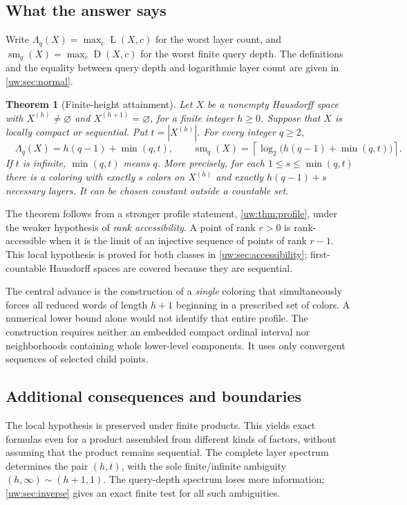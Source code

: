 \documentclass[11pt,letterpaper]{article}
\numberwithin{equation}{section}
\newtheorem{theorem}{Theorem}[section]
\theoremstyle{definition}
\theoremstyle{remark}
\theoremstyle{definition}
\newcommand{\ceil}[1]{\left\lceil#1\right\rceil}
\newcommand{\depth}{\operatorname{D}}
\newcommand{\layers}{\operatorname{L}}
\newcommand{\smq}{\operatorname{sm}_{q}}
\begin{document}
\subsection{What the answer says}
Write $\Lambda_q(X)=\max_c\layers(X,c)$ for the worst layer count, and
$\smq(X)=\max_c\depth(X,c)$ for the worst finite query depth. The definitions
and the equality between query depth and logarithmic layer count are given
in \cref{uw:sec:normal}.

\begin{theorem}[Finite-height attainment]\label{uw:thm:intro}
Let $X$ be a nonempty Hausdorff space with
$X^{(h)}\ne\varnothing$ and $X^{(h+1)}=\varnothing$, for a finite integer
$h\ge0$. Suppose that $X$ is locally compact or sequential. Put
$t=|X^{(h)}|$. For every integer $q\ge2$,
\begin{equation}\label{uw:eq:main-formula}
 \boxed{\quad
 \Lambda_q(X)=h(q-1)+\min(q,t),\qquad
 \smq(X)=\ceil{\log_2\bigl(h(q-1)+\min(q,t)\bigr)}.
 \quad}
\end{equation}
If $t$ is infinite, $\min(q,t)$ means $q$. More precisely, for each
$1\le s\le\min(q,t)$ there is a coloring with exactly $s$ colors on
$X^{(h)}$ and exactly $h(q-1)+s$ necessary layers. It can be chosen constant
outside a countable set.
\end{theorem}

The theorem follows from a stronger profile statement, \cref{uw:thm:profile},
under the weaker hypothesis of \emph{rank accessibility}. A point of rank
$r>0$ is rank-accessible when it is the limit of an injective sequence of
points of rank $r-1$. This local hypothesis is proved for both classes in
\cref{uw:sec:accessibility}; first-countable Hausdorff spaces are covered because
they are sequential.

The central advance is the construction of a \emph{single} coloring that
simultaneously forces all reduced words of length $h+1$ beginning in a
prescribed set of colors. A numerical lower bound alone would not identify
that entire profile. The construction requires neither an embedded compact
ordinal interval nor neighborhoods containing whole lower-level components.
It uses only convergent sequences of selected child points.

\subsection{Additional consequences and boundaries}
The local hypothesis is preserved under finite products. This yields exact
formulas even for a product assembled from different kinds of factors, without
assuming that the product remains sequential. The complete layer spectrum
determines the pair $(h,t)$, with the sole finite/infinite ambiguity
$(h,\infty)\sim(h+1,1)$. The query-depth spectrum loses more information;
\cref{uw:sec:inverse} gives an exact finite test for all such ambiguities.
\end{document}
